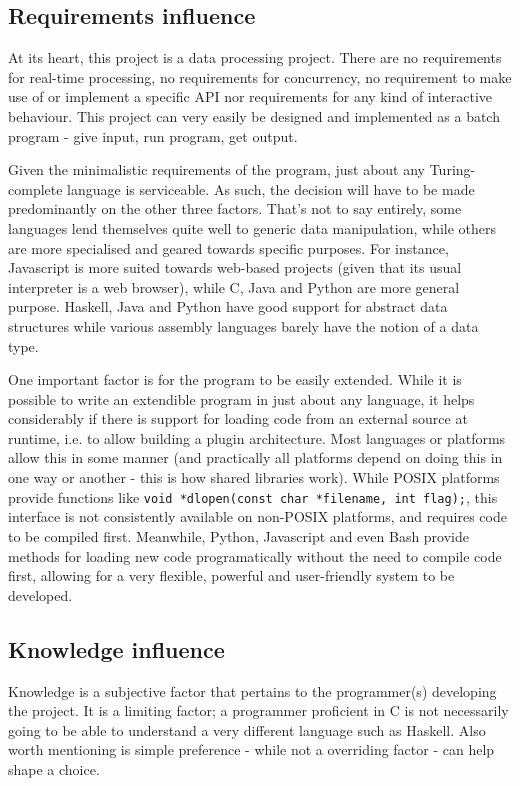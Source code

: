\documentclass[10pt,a4paper,notitlepage,twoside]{report}
\begin{document}
\subsection{Requirements influence}
At its heart, this project is a data processing project. There are no requirements for real-time processing, no requirements for concurrency, no requirement to make use of or implement a specific API nor requirements for any kind of interactive behaviour. This project can very easily be designed and implemented as a batch program - give input, run program, get output.

Given the minimalistic requirements of the program, just about any Turing-complete language is serviceable. As such, the decision will have to be made predominantly on the other three factors. That's not to say entirely, some languages lend themselves quite well to generic data manipulation, while others are more specialised and geared towards specific purposes. For instance, Javascript is more suited towards web-based projects (given that its usual interpreter is a web browser), while C, Java and Python are more general purpose. Haskell, Java and Python have good support for abstract data structures while various assembly languages barely have the notion of a data type.

One important factor is for the program to be easily extended. While it is possible to write an extendible program in just about any language, it helps considerably if there is support for loading code from an external source at runtime, i.e. to allow building a plugin architecture.
Most languages or platforms allow this in some manner (and practically all platforms depend on doing this in one way or another - this is how shared libraries work). While POSIX platforms provide functions like \lstinline$void *dlopen(const char *filename, int flag);$, this interface is not consistently available on non-POSIX platforms, and requires code to be compiled first. Meanwhile, Python, Javascript and even Bash provide methods for loading new code programatically without the need to compile code first, allowing for a very flexible, powerful and user-friendly system to be developed.

\subsection{Knowledge influence}
Knowledge is a subjective factor that pertains to the programmer(s) developing the project. It is a limiting factor; a programmer proficient in C is not necessarily going to be able to understand a very different language such as Haskell. Also worth mentioning is simple preference - while not a overriding factor - can help shape a choice.
\end{document}
